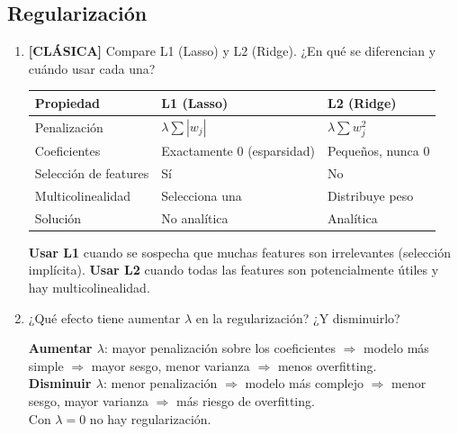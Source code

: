 \documentclass[11pt,a4paper]{article}
\begin{document}
\subsection{Regularizaci\'on}

\begin{enumerate}[label=\textbf{P\arabic*.}, resume]

\item \leavevmode

\begin{classicbox}
\textcolor{tdred}{\textbf{[CL\'ASICA]}} Compare L1 (Lasso) y L2 (Ridge). ¿En qu\'e
se diferencian y cu\'ando usar cada una?
\end{classicbox}

\begin{answerbox}
\begin{center}
\begin{tabular}{lll}
\toprule
\textbf{Propiedad} & \textbf{L1 (Lasso)} & \textbf{L2 (Ridge)}\\
\midrule
Penalizaci\'on & $\lambda \sum |w_j|$ & $\lambda \sum w_j^2$\\
Coeficientes & Exactamente 0 (esparsidad) & Peque\~nos, nunca 0\\
Selecci\'on de features & S\'i & No\\
Multicolinealidad & Selecciona una & Distribuye peso\\
Soluci\'on & No anal\'itica & Anal\'itica\\
\bottomrule
\end{tabular}
\end{center}
\textbf{Usar L1} cuando se sospecha que muchas features son irrelevantes (selecci\'on
impl\'icita). \textbf{Usar L2} cuando todas las features son potencialmente \'utiles y
hay multicolinealidad.
\end{answerbox}

\item ¿Qu\'e efecto tiene aumentar $\lambda$ en la regularizaci\'on? ¿Y disminuirlo?

\begin{answerbox}
\textbf{Aumentar $\lambda$}: mayor penalizaci\'on sobre los coeficientes $\Rightarrow$
modelo m\'as simple $\Rightarrow$ mayor sesgo, menor varianza $\Rightarrow$ menos
overfitting.\\
\textbf{Disminuir $\lambda$}: menor penalizaci\'on $\Rightarrow$ modelo m\'as complejo
$\Rightarrow$ menor sesgo, mayor varianza $\Rightarrow$ m\'as riesgo de overfitting.\\
Con $\lambda=0$ no hay regularizaci\'on.
\end{answerbox}

\end{enumerate}
\end{document}
